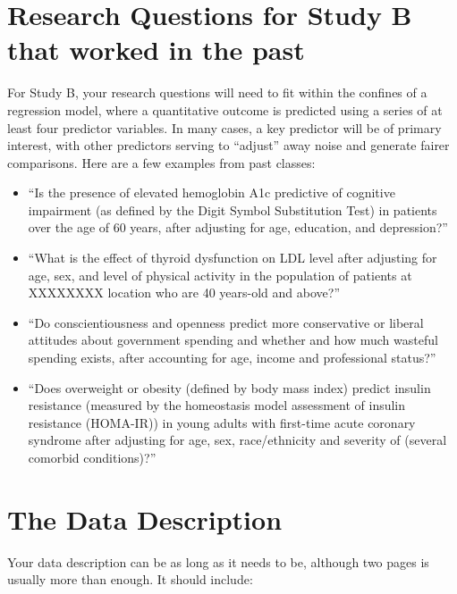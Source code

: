 \documentclass[]{book}
\providecommand{\tightlist}{%
  \setlength{\itemsep}{0pt}\setlength{\parskip}{0pt}}
\begin{document}
\hypertarget{research-questions-for-study-b-that-worked-in-the-past}{%
\section{Research Questions for Study B that worked in the past}\label{research-questions-for-study-b-that-worked-in-the-past}}

For Study B, your research questions will need to fit within the confines of a regression model, where a quantitative outcome is predicted using a series of at least four predictor variables. In many cases, a key predictor will be of primary interest, with other predictors serving to ``adjust'' away noise and generate fairer comparisons. Here are a few examples from past classes:

\begin{itemize}
\tightlist
\item
  ``Is the presence of elevated hemoglobin A1c predictive of cognitive impairment (as defined by the Digit Symbol Substitution Test) in patients over the age of 60 years, after adjusting for age, education, and depression?''
\item
  ``What is the effect of thyroid dysfunction on LDL level after adjusting for age, sex, and level of physical activity in the population of patients at XXXXXXXX location who are 40 years-old and above?''
\item
  ``Do conscientiousness and openness predict more conservative or liberal attitudes about government spending and whether and how much wasteful spending exists, after accounting for age, income and professional status?''
\item
  ``Does overweight or obesity (defined by body mass index) predict insulin resistance (measured by the homeostasis model assessment of insulin resistance (HOMA-IR)) in young adults with first-time acute coronary syndrome after adjusting for age, sex, race/ethnicity and severity of (several comorbid conditions)?''
\end{itemize}

\hypertarget{the-data-description}{%
\section{The Data Description}\label{the-data-description}}

Your data description can be as long as it needs to be, although two pages is usually more than enough. It should include:
\end{document}
